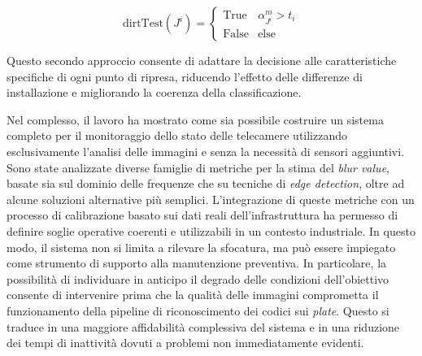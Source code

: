 \documentclass[
    target=bach,
    aauheader=,
    style=
]{thud}
\begin{document}
\begin{equation}
\text{dirtTest}(J^i) = 
\begin{cases}
  \text{True} & \alpha_{J^i}^m > t_i \\
  \text{False} & \text{else}
\end{cases}
\end{equation}

Questo secondo approccio consente di adattare la decisione alle caratteristiche specifiche di ogni punto di ripresa, riducendo l'effetto delle differenze di installazione e migliorando la coerenza della classificazione.

Nel complesso, il lavoro ha mostrato come sia possibile costruire un sistema completo per il monitoraggio dello stato delle telecamere utilizzando esclusivamente l'analisi delle immagini e senza la necessità di sensori aggiuntivi. Sono state analizzate diverse famiglie di metriche per la stima del \textit{blur value}, basate sia sul dominio delle frequenze che su tecniche di \textit{edge detection}, oltre ad alcune soluzioni alternative più semplici. L'integrazione di queste metriche con un processo di calibrazione basato sui dati reali dell'infrastruttura ha permesso di definire soglie operative coerenti e utilizzabili in un contesto industriale. In questo modo, il sistema non si limita a rilevare la sfocatura, ma può essere impiegato come strumento di supporto alla manutenzione preventiva. In particolare, la possibilità di individuare in anticipo il degrado delle condizioni dell'obiettivo consente di intervenire prima che la qualità delle immagini comprometta il funzionamento della pipeline di riconoscimento dei codici sui \textit{plate}. Questo si traduce in una maggiore affidabilità complessiva del sistema e in una riduzione dei tempi di inattività dovuti a problemi non immediatamente evidenti.

\backmatter




\end{document}
